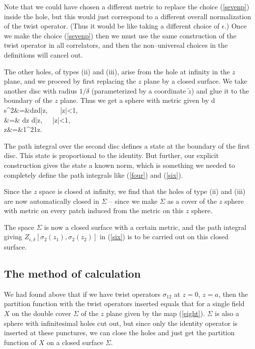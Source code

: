 \documentclass[12pt]{article}
\begin{document}
Note that we could have chosen a
different metric to replace the choice (\ref{sevenp}) inside the
hole, but this would just correspond to a
different overall normalization of the twist operator. (Thus it would
be  like taking a different choice of
$\epsilon$.)  Once we make the choice (\ref{sevenp}) then
we must use the same construction of the twist operator in all
correlators, and then the non--universal choices
in the definitions will cancel out.

The other holes, of types (ii) and (iii), arise from the hole at
infinity in the $z$ plane, and we proceed by first
replacing the $z$ plane by a closed surface.  We take another disc
with  radius $1/\delta$  (parameterized
by a coordinate $\tilde z$) and glue it to the boundary of the $z$
plane. Thus we get a sphere with metric given
by
\bea
d s^2&=&dzd\bar z, ~~~|z|<{1\over \delta},\nonumber \\
&=& d\tilde z d\bar{\tilde z},~~~|\tilde z|<{1\over \delta},\nonumber \\
\tilde z&=&{1\over \delta^2}{1\over z}.
\label{twp}
\eea

The path integral over the second disc defines a state at the
boundary of the first disc. This state is
proportional to the identity. But further,  our  explicit
construction gives the state a known norm, which is
something we needed to completely define the path integrals like
(\ref{four}) and (\ref{six}).

Since the $z$ space is closed at infinity, we find that the holes of
type (ii) and (iii) are now automatically closed
in $\Sigma$ --  since we make $\Sigma$ as a cover of the $z$ sphere
with metric on every patch induced
from the metric on this $z$ sphere.

The space $\Sigma$ is now a closed surface with a certain metric, and
the path integral giving $Z_{\epsilon,
\delta}[\sigma_2(z_1), \sigma_2(z_2)]$ in (\ref{six}) is to be
carried out on this closed surface.


\subsection{The method of calculation}

We had found above that if we have twist operators $\sigma_{12}$ at
$z=0$, $z=a$, then the partition function with the
twist operators inserted equals that for a single field $X$ on the
double cover $\Sigma$ of the $z$ plane given by the map
(\ref{eight}). $\Sigma$ is also a sphere with infinitesimal holes cut
out, but since only the identity operator is inserted at
these punctures, we  can close the holes and just get the partition
function of $X$ on
a closed surface  $\Sigma$.
\end{document}
